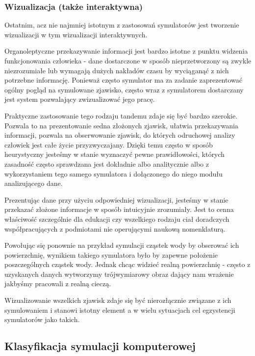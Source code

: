 \subsubsection{Wizualizacja (także interaktywna)}
\par{
Ostatnim, acz nie najmniej istotnym z zastosowań symulatorów jest tworzenie wizualizacji w tym wizualizacji interaktywnych.
}
\par{
Organoleptyczne przekazywanie informacji jest bardzo istotne z punktu widzenia funkcjonowania człowieka - dane dostarczone w sposób nieprzetworzony są zwykle niezrozumiałe lub wymagają dużych nakładów czasu by wyciąganąć z nich potrzebne informację. Ponieważ często symulator ma za zadanie zaprezentować ogólny pogląd na symulowane zjawisko, często wraz z symulatorem dostarczany jest system pozwalający zwizualizować jego pracę.
}
\par{
Praktyczne zastosowanie tego rodzaju tandemu zdaje się być bardzo szerokie. Pozwala to na prezentowanie sedna złożonych zjawisk, ułatwia przekazywania informacji, pozwala na obserwowanie zjawisk, do których odruchowej analizy człowiek jest całe życie przyzwyczajany. Dzięki temu często w sposób heurystyczny jesteśmy w stanie wyznaczyć pewne prawidłowości, których zasadność często sprawdzana jest dokładnie albo analitycznie albo z wykorzystaniem tego samego symulatora i dołączonego do niego modułu analizującego dane.
}
\par{
Prezentując dane przy użyciu odpowiedniej wizualizacji, jesteśmy w stanie przekazać złożone informacje w sposób intuicyjnie zrozumiały. Jest to cenna właściwość szczególnie dla edukacji czy wszelkiego rodzaju ciał doradczych współpracujących z podmiotami nie operującymi naukową nomenklaturą.
}
\par{
Powołując się ponownie na przykład symulacji cząstek wody by obserować ich powierzchnię, wynikiem takiego symulatora było by zapewne położenie poszczególnych cząstek wody. Jednak chcąc widzieć realną powierzchnię - często z uzyskanych danych wytworzymy trójwymiarowy obraz dający nam wrażenie jakbyśmy pracowali z realną cieczą.
}
\par{
Wizualizowanie wszelkich zjawisk zdaje się być nierozłącznie związane z ich symulowaniem i stanowi istotny element a w wielu sytuacjach cel egzystencji symulatorów jako takich.
}

\subsection{Klasyfikacja symulacji komputerowej}

